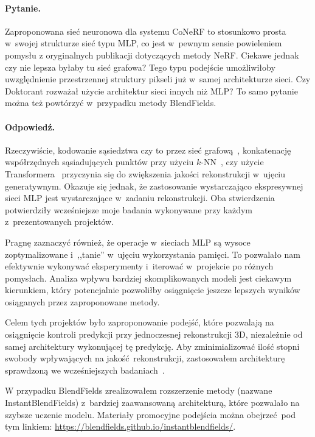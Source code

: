 \documentclass{rebuttal}
\begin{document}
  \responsedelimiter

\paragraph{Pytanie.}
  Zaproponowana sieć neuronowa dla systemu CoNeRF to stosunkowo prosta w~swojej
  strukturze sieć typu MLP, co jest w~pewnym sensie powieleniem pomysłu z
  oryginalnych publikacji dotyczących metody NeRF. Ciekawe jednak czy nie lepsza
  byłaby tu sieć grafowa? Tego typu podejście umożliwiłoby uwzględnienie
  przestrzennej struktury pikseli już w~samej architekturze sieci. Czy Doktorant
  rozważał użycie architektur sieci innych niż MLP? To samo pytanie można też
  powtórzyć w~przypadku metody BlendFields.

\paragraph{Odpowiedź.} Rzeczywiście, kodowanie sąsiedztwa czy to przez sieć
  grafową~\cite{ververas2024sags}, konkatenację współrzędnych sąsiadujących
  punktów przy użyciu $k$-NN~\cite{dupont2022from}, czy użycie
  Transformera~\cite{joshi2025transformers,zhuang2023diffusion} przyczynia się
  do zwiększenia jakości rekonstrukcji w~ujęciu generatywnym. Okazuje się
  jednak, że zastosowanie wystarczająco ekspresywnej sieci MLP jest
  wystarczające w~zadaniu rekonstrukcji. Oba stwierdzenia potwierdziły
  wcześniejsze moje badania wykonywane przy każdym z~prezentowanych projektów.

  Pragnę zaznaczyć również, że operacje w~sieciach MLP są wysoce zoptymalizowane
  i~,,tanie'' w~ujęciu wykorzystania pamięci. To pozwalało nam efektywnie
  wykonywać eksperymenty i~iterować w~projekcie po różnych pomysłach. Analiza
  wpływu bardziej skomplikowanych modeli jest ciekawym kierunkiem, który
  potencjalnie pozwoliłby osiągnięcie jeszcze lepszych wyników osiąganych przez
  zaproponowane metody.

  Celem tych projektów było zaproponowanie podejść, które pozwalają na
  osiągnięcie kontroli predykcji przy jednoczesnej rekonstrukcji 3D, niezależnie
  od samej architektury wykonującej tę predykcję. Aby zminimializować ilość
  stopni swobody wpływających na jakość rekonstrukcji, zastosowałem architekturę
  sprawdzoną we wcześniejszych
  badaniach~\cite{mildenhall2020nerf,park2021nerfies}.

  W przypadku BlendFields zrealizowałem rozszerzenie metody (nazwane
  InstantBlendFields) z~bardziej zaawansowaną architekturą, które pozwalało na
  szybsze uczenie modelu. Materiały promocyjne podejścia można obejrzeć pod tym
  linkiem: \url{https://blendfields.github.io/instantblendfields/}.
\end{document}
